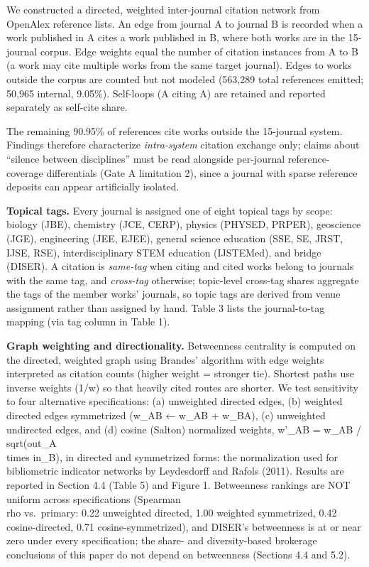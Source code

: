 \documentclass[pdflatex,sn-apa]{sn-jnl}
\begin{document}
We constructed a directed, weighted inter-journal citation network from
OpenAlex reference lists. An edge from journal A to journal B is
recorded when a work published in A cites a work published in B, where
both works are in the 15-journal corpus. Edge weights equal the number
of citation instances from A to B (a work may cite multiple works from
the same target journal). Edges to works outside the corpus are counted
but not modeled (563,289 total references emitted; 50,965 internal,
9.05\%). Self-loops (A citing A) are retained and reported separately as
self-cite share.

The remaining 90.95\% of references cite works outside the 15-journal
system. Findings therefore characterize \emph{intra-system} citation
exchange only; claims about ``silence between disciplines'' must be read
alongside per-journal reference-coverage differentials (Gate A
limitation 2), since a journal with sparse reference deposits can appear
artificially isolated.

\textbf{Topical tags.} Every journal is assigned one of eight topical
tags by scope: biology (JBE), chemistry (JCE, CERP), physics (PHYSED,
PRPER), geoscience (JGE), engineering (JEE, EJEE), general science
education (SSE, SE, JRST, IJSE, RSE), interdisciplinary STEM education
(IJSTEMed), and bridge (DISER). A citation is \emph{same-tag} when
citing and cited works belong to journals with the same tag, and
\emph{cross-tag} otherwise; topic-level cross-tag shares aggregate the
tags of the member works' journals, so topic tags are derived from venue
assignment rather than assigned by hand. Table 3 lists the
journal-to-tag mapping (via tag column in Table 1).

\textbf{Graph weighting and directionality.} Betweenness centrality is
computed on the directed, weighted graph using Brandes' algorithm with
edge weights interpreted as citation counts (higher weight = stronger
tie). Shortest paths use inverse weights (1/w) so that heavily cited
routes are shorter. We test sensitivity to four alternative
specifications: (a) unweighted directed edges, (b) weighted directed
edges symmetrized (w\_AB ← w\_AB + w\_BA), (c) unweighted undirected
edges, and (d) cosine (Salton) normalized weights, w'\_AB = w\_AB /
sqrt(out\_A \\times in\_B), in directed and symmetrized forms: the
normalization used for bibliometric indicator networks by Leydesdorff
and Rafols (2011). Results are reported in Section 4.4 (Table 5) and
Figure 1. Betweenness rankings are NOT uniform across specifications
(Spearman \\rho vs.~primary: 0.22 unweighted directed, 1.00 weighted
symmetrized, 0.42 cosine-directed, 0.71 cosine-symmetrized), and DISER's
betweenness is at or near zero under every specification; the share- and
diversity-based brokerage conclusions of this paper do not depend on
betweenness (Sections 4.4 and 5.2).
\end{document}
